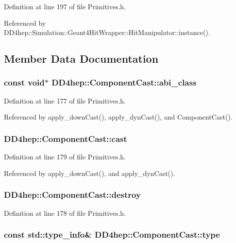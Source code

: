 Definition at line 197 of file Primitives.h.

Referenced by DD4hep::Simulation::Geant4HitWrapper::HitManipulator::instance().

\subsection{Member Data Documentation}
\hypertarget{class_d_d4hep_1_1_component_cast_ae8cce3fcc69745f330272a49d51024dd}{
\subsubsection[{abi\_\-class}]{\setlength{\rightskip}{0pt plus 5cm}const void$\ast$ {\bf DD4hep::ComponentCast::abi\_\-class}}}
\label{class_d_d4hep_1_1_component_cast_ae8cce3fcc69745f330272a49d51024dd}


Definition at line 177 of file Primitives.h.

Referenced by apply\_\-downCast(), apply\_\-dynCast(), and ComponentCast().\hypertarget{class_d_d4hep_1_1_component_cast_a2f6cd06755e613e3f02c5302361d7024}{
\subsubsection[{cast}]{ {\bf DD4hep::ComponentCast::cast}}}
\label{class_d_d4hep_1_1_component_cast_a2f6cd06755e613e3f02c5302361d7024}


Definition at line 179 of file Primitives.h.

Referenced by apply\_\-downCast(), and apply\_\-dynCast().\hypertarget{class_d_d4hep_1_1_component_cast_af161de076d882540309e24d86ef50137}{
\subsubsection[{destroy}]{ {\bf DD4hep::ComponentCast::destroy}}}
\label{class_d_d4hep_1_1_component_cast_af161de076d882540309e24d86ef50137}


Definition at line 178 of file Primitives.h.\hypertarget{class_d_d4hep_1_1_component_cast_a984d18ed863fe54855cf3308560270f0}{
\subsubsection[{type}]{\setlength{\rightskip}{0pt plus 5cm}const std::type\_\-info\& {\bf DD4hep::ComponentCast::type}}}
\label{class_d_d4hep_1_1_component_cast_a984d18ed863fe54855cf3308560270f0}


